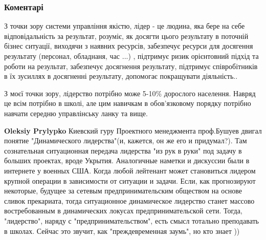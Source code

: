  
 
 
 
 
\subsubsection{Коментарі}
\label{sec:06_04_2021.fb.kuchinskij_sergej.1.liderstvo.cmt}

\begin{itemize}
 

З точки зору системи управління якістю, лідер - це людина, яка бере на себе
відповідальність за результат, розуміє, як досягти цього результату в поточній
бізнес ситуації, виходячи з наявних ресурсів, забезпечує ресурси для досягення
результату (персонал, обладнаня, час ...) , підтримує ризик орієнтовний підхід
та роботи на результат, забезпечує досягнення результату, підтримує
співробітників в їх зусиллях в досягненні результату, допомогає покращувати
діяльність..

З моєї точки зору, лідерство потрібно може 5-10\% дорослого населення. Навряд
це всім потрібно в школі, але цим навичкам в обов'язковому порядку потрібно
навчати середню управлінську ланку та вище.

\begin{itemize}
 
\textbf{Oleksiy Prylypko} Киевский гуру Проектного менеджмента проф.Бушуев
двигал понятие "Динамического лидерства"(и, кажется, он же его и придумал?).
Там сознательная ситуационная передача лидерства "из рук в руки" под задачу в
больших проектах, вроде Укрытия. Аналогичные наметки и дискуссии были в
интернете у военных США. Когда любой лейтенант может становиться лидером
крупной операции в зависимости от ситуации и задачи. Если, как прогнозируют
некоторые, будущее за сетевым предпринимательским обществом на основе сливок
прекариата, тогда ситуационное динамическое лидерство станет массово
востребованным в динамических локусах предпринимательской сети. Тогда,
"лидерство", наряду с "предпринимательством", есть смысл тотально преподавать в
школах. Сейчас это звучит, как "преждевременная заумь", но кто знает ))


\end{itemize}
\end{itemize}
